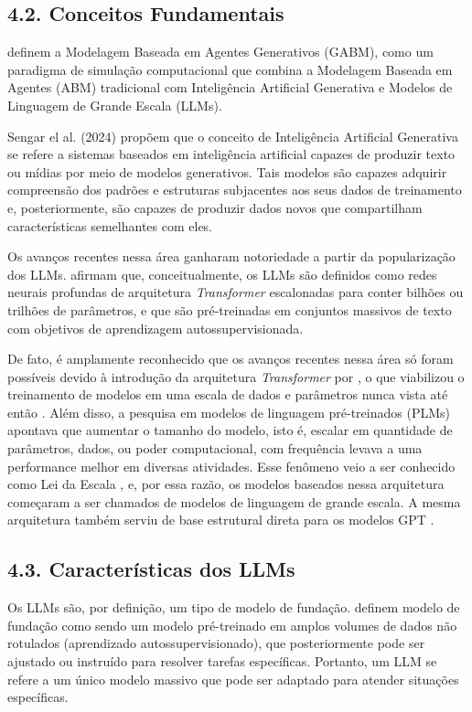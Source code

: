 \documentclass[12pt,oneside,a4paper,brazil,sumario=tradicional]{abntex2}
\begin{document}
\subsection*{4.2. Conceitos Fundamentais}
 definem a Modelagem Baseada em Agentes Generativos (GABM), como um paradigma de simulação computacional que combina a Modelagem Baseada em Agentes (ABM) tradicional com  Inteligência Artificial Generativa e Modelos de Linguagem de Grande Escala (LLMs).

Sengar el al. (2024) propõem que o conceito de Inteligência Artificial Generativa se refere a sistemas baseados em inteligência artificial capazes de produzir texto ou mídias por meio de modelos generativos. Tais modelos são capazes adquirir compreensão dos padrões e estruturas subjacentes aos seus dados de treinamento e, posteriormente, são capazes de produzir dados novos que compartilham características semelhantes com eles.

Os avanços recentes nessa área ganharam notoriedade a partir da popularização dos LLMs.  afirmam que,  conceitualmente, os LLMs são definidos como redes neurais profundas de arquitetura \textit{Transformer} \cite{vaswani2017} escalonadas para conter bilhões ou trilhões de parâmetros, e que são pré-treinadas em conjuntos massivos de texto com objetivos de aprendizagem autossupervisionada.

De fato, é amplamente reconhecido que os avanços recentes nessa área só foram possíveis devido à introdução da arquitetura \textit{Transformer} por , o que viabilizou o treinamento de modelos em uma escala de dados e parâmetros nunca vista até então \cite{storey2025, narapareddy2025, he2025}. Além disso,  a pesquisa em modelos de linguagem pré-treinados (PLMs) apontava que aumentar o tamanho do modelo, isto é, escalar em quantidade de parâmetros, dados, ou poder computacional, com frequência levava a uma performance melhor em diversas atividades. Esse fenômeno veio a ser conhecido como Lei da Escala \cite{kaplan2020, zhao2023}, e, por essa razão, os modelos baseados nessa arquitetura começaram a ser chamados de modelos de linguagem de grande escala. A mesma arquitetura também serviu de base estrutural direta para os modelos GPT .

\subsection*{4.3. Características dos LLMs}
Os LLMs são, por definição, um tipo de modelo de fundação.  definem modelo de fundação como sendo um modelo pré-treinado em amplos volumes de dados não rotulados (aprendizado autossupervisionado), que posteriormente pode ser ajustado ou instruído para resolver tarefas específicas. Portanto, um LLM se refere a um único modelo massivo que pode ser adaptado para atender situações específicas.
\end{document}

